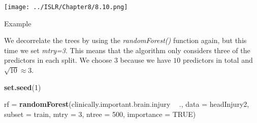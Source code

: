 \documentclass[ignorenonframetext,]{beamer}
\newenvironment{Shaded}{\begin{snugshade}}{\end{snugshade}}
\newcommand{\KeywordTok}[1]{\textcolor[rgb]{0.13,0.29,0.53}{\textbf{#1}}}
\newcommand{\DataTypeTok}[1]{\textcolor[rgb]{0.13,0.29,0.53}{#1}}
\newcommand{\DecValTok}[1]{\textcolor[rgb]{0.00,0.00,0.81}{#1}}
\newcommand{\StringTok}[1]{\textcolor[rgb]{0.31,0.60,0.02}{#1}}
\newcommand{\OtherTok}[1]{\textcolor[rgb]{0.56,0.35,0.01}{#1}}
\newcommand{\OperatorTok}[1]{\textcolor[rgb]{0.81,0.36,0.00}{\textbf{#1}}}
\newcommand{\NormalTok}[1]{#1}
\begin{document}
\begin{frame}

\texttt{[image: ../ISLR/Chapter8/8.10.png]}

\end{frame}

\begin{frame}[fragile]

\begin{block}{Example}

We decorrelate the trees by using the \emph{randomForest()} function
again, but this time we set \emph{mtry=3}. This means that the algorithm
only considers three of the predictors in each split. We choose \(3\)
because we have \(10\) predictors in total and \(\sqrt{10}\approx 3\).

\begin{Shaded}
\begin{Highlighting}[]
\KeywordTok{set.seed}\NormalTok{(}\DecValTok{1}\NormalTok{)}

\NormalTok{rf =}\StringTok{ }\KeywordTok{randomForest}\NormalTok{(clinically.important.brain.injury }\OperatorTok{~}\StringTok{ }\NormalTok{., }\DataTypeTok{data =}\NormalTok{ headInjury2, }
    \DataTypeTok{subset =}\NormalTok{ train, }\DataTypeTok{mtry =} \DecValTok{3}\NormalTok{, }\DataTypeTok{ntree =} \DecValTok{500}\NormalTok{, }\DataTypeTok{importance =} \OtherTok{TRUE}\NormalTok{)}
\end{Highlighting}
\end{Shaded}

\end{block}

\end{frame}
\end{document}
